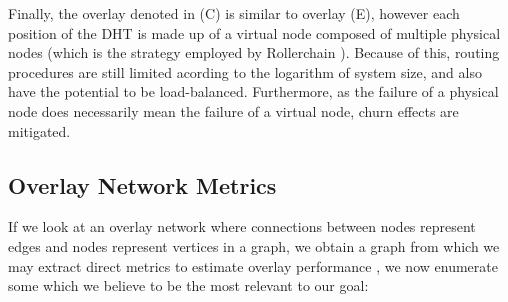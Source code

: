 Finally, the overlay denoted in (C) is similar to overlay (E), however each position of the DHT is made up of a virtual node composed of multiple physical nodes (which is the strategy employed by Rollerchain \cite{rollerchain}). Because of this, routing procedures are still limited acording to the logarithm of system size, and also have the potential to be load-balanced. Furthermore, as the failure of a physical node does necessarily mean the failure of a virtual node, churn effects are mitigated. 
 
\subsection{Overlay Network Metrics}

If we look at an overlay network where connections between nodes represent edges and nodes represent vertices in a graph, we obtain a graph from which we may extract direct metrics to estimate overlay performance \cite{leitaoPHDthesis}, we now enumerate some which we believe to be the most relevant to our goal:

